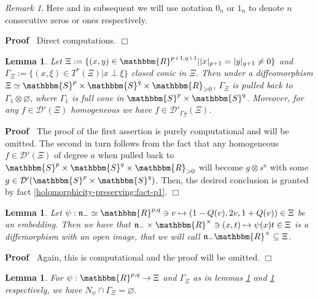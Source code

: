 \documentclass{article}
\newcommand{\nobracket}{}
\newcommand{\assign}{:=}
\renewenvironment{proof}{\noindent\textbf{Proof\ }}{\hspace*{\fill}$\Box$\medskip}
\newtheorem{lemma}[proposition]{Lemma}
\theoremstyle{remark}
\newtheorem{remark}[proposition]{Remark}
\begin{document}
\begin{remark}
  Here and in subsequent we will use notation $0_n$ or $1_n$ to denote $n$
  consecutive zeros or ones respectively.
\end{remark}

\begin{proof}
  Direct computations.
\end{proof}

\begin{lemma}
  \label{k-finite:lem-homocone}Let $\Xi \assign \{ (x, y) \in \mathbbm{R}^{p +
  1, q + 1} |  | x |_{p + 1} = | y |_{q + 1} \neq 0 \}$ and $\Gamma_{\Xi}
  \assign \{ (x, \xi) \in T^{\nobracket \ast \nobracket} (\Xi) | x \perp
  \xi \}$ closed conic in $\Xi$. Then under a diffeomorphism $\Xi \simeq
  \mathbbm{S}^p \times \mathbbm{S}^q \times \mathbbm{R}_{> 0}$, $\Gamma_{\Xi}$
  is pulled back to $\Gamma_1 \otimes \varnothing$, where $\Gamma_1$ is full
  cone in $\mathbbm{S}^p \times \mathbbm{S}^q$. Moreover, for any $f \in
  \mathcal{D}' (\Xi)$ homogeneous we have $f \in \mathcal{D}'_{\Gamma_{\Xi}}
  (\Xi)$.
\end{lemma}

\begin{proof}
  The proof of the first assertion is purely computational and will be
  omitted. The second in turn follows from the fact that any homogeneous $f
  \in \mathcal{D}' (\Xi)$ of degree $a$ when pulled back to $\mathbbm{S}^p
  \times \mathbbm{S}^q \times \mathbbm{R}_{> 0}$ will become $g \otimes s^a$
  with some $g \in \mathcal{D}' (\mathbbm{S}^p \times \mathbbm{S}^q)$. Then,
  the desired conclusion is granted by fact
  \ref{holomorphicity-preserving:fact-p1}.
\end{proof}

\begin{lemma}
  \label{k-finite:lem-claim1-aux}Let $\psi : \mathfrak{n}_- \simeq
  \mathbbm{R}^{p, q} \ni v \mapsto (1 - Q (v), 2 v, 1 + Q (v)) \in \Xi$ be an
  embedding. Then we have that $\mathfrak{n}_- \times \mathbbm{R}^{\times} \ni
  (x, t) \mapsto \psi (x) t \in \Xi$ is a diffemorphism with an open image,
  that we will call $\mathfrak{n}_- \mathbbm{R}^{\times} \subseteq \Xi$.
\end{lemma}

\begin{proof}
  Again, this is computational and the proof will be omitted.
\end{proof}

\begin{lemma}
  \label{k-finite:lem-restriction-to-N}For $\psi : \mathbbm{R}^{p, q}
  \rightarrow \Xi$ and $\Gamma_{\Xi}$ as in lemmas
  \ref{k-finite:lem-claim1-aux} and \ref{k-finite:lem-homocone} respectively,
  we have $N_{\psi} \cap \Gamma_{\Xi} = \varnothing .$
\end{lemma}
\end{document}
